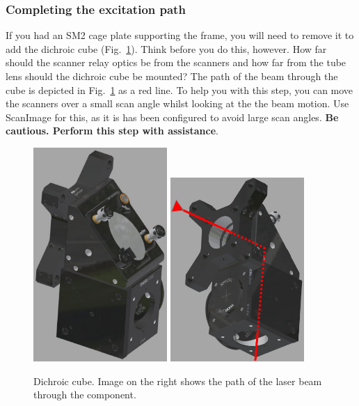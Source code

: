 \documentclass[a4paper]{report}
\begin{document}
\clearpage

\subsubsection{Completing the excitation path}
If you had an SM2 cage plate supporting the frame, you will need to remove it to add the dichroic cube (Fig.~\ref{fig:dichroic_holder}).
Think before you do this, however. 
How far should the scanner relay optics be from the scanners and how far from the tube lens should the dichroic cube be mounted?
The path of the beam through the cube is depicted in Fig.~\ref{fig:dichroic_holder} as a red line.
To help you with this step, you can move the scanners over a small scan angle whilst looking at the the beam motion. 
Use ScanImage for this, as it is has been configured to avoid large scan angles.
\textbf{Be cautious. Perform this step with assistance}.

\begin{figure}[h]
\center
\includegraphics[width=2.0in]{dichroic_cube.eps}
\includegraphics[width=2.0in]{laser_path_through_cube.eps}
\caption{Dichroic cube. Image on the right shows the path of the laser beam through the component.}
\label{fig:dichroic_holder}
\end{figure}
\end{document}
